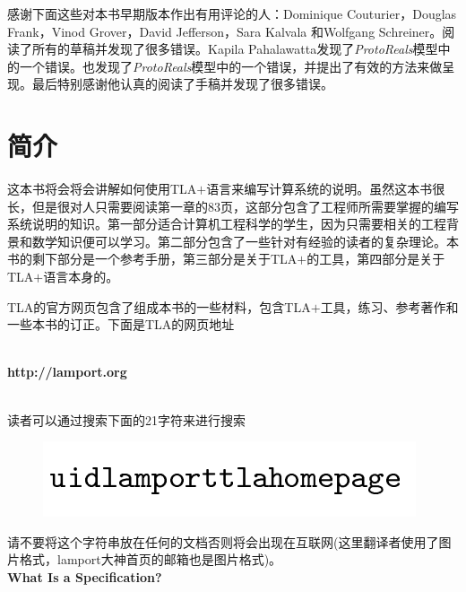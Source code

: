\documentclass[utf8]{book}
\begin{document}
感谢下面这些对本书早期版本作出有用评论的人：Dominique Couturier，Douglas Frank，Vinod Grover，David Jefferson，Sara Kalvala 和Wolfgang Schreiner。阅读了所有的草稿并发现了很多错误。Kapila Pahalawatta发现了\textit{ProtoReals}模型中的一个错误。也发现了\textit{ProtoReals}模型中的一个错误，并提出了有效的方法来做呈现。最后特别感谢他认真的阅读了手稿并发现了很多错误。

 
\chapter{简介}
这本书将会将会讲解如何使用TLA$+$语言来编写计算系统的说明。虽然这本书很长，但是很对人只需要阅读第一章的83页，这部分包含了工程师所需要掌握的编写系统说明的知识。第一部分适合计算机工程科学的学生，因为只需要相关的工程背景和数学知识便可以学习。第二部分包含了一些针对有经验的读者的复杂理论。本书的剩下部分是一个参考手册，第三部分是关于TLA$+$的工具，第四部分是关于TLA$+$语言本身的。

TLA的官方网页包含了组成本书的一些材料，包含TLA$+$工具，练习、参考著作和一些本书的订正。下面是TLA的网页地址\\
\ \\
\centerline{\textbf{http://lamport.org}}\\

读者可以通过搜索下面的21字符来进行搜索
\begin{figure}[htbp]
\begin{center}
\includegraphics[width=0.4\linewidth]{./fig/fig_0_2.png}
\end{center}
\end{figure}

请不要将这个字符串放在任何的文档否则将会出现在互联网(这里翻译者使用了图片格式，lamport大神首页的邮箱也是图片格式)。\\

\textbf{\large{What Is a Specification?}}\\
\\
\\
\\
\end{document}

